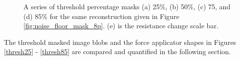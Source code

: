 \begin{figure}[H]
\begin{minipage}[t]{.1\textwidth}
        \hfill
    \end{minipage}  
\caption{A series of threshold percentage masks (a) 25\%, (b) 50\%, (c) 75, and (d) 85\% for the same reconstruction given in Figure \ref{fig:noise_floor_mask_8p}. (e) is the resistance change scale bar.}
\label{fig:thresh_masks}
\end{figure}
The threshold masked image blobs and the force applicator shapes in Figures \ref{thresh25} - \ref{thresh85} are compared and quantified in the following section.

